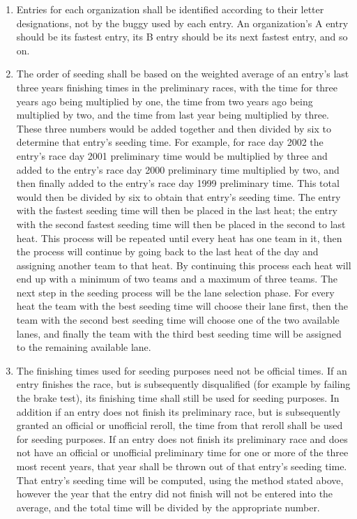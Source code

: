 	\begin{enumerate}

		\item Entries for each organization shall be identified according to their letter designations, not by the buggy used by each entry. An organization's A entry should be its fastest entry, its B entry should be its next fastest entry, and so on.

		\item The order of seeding shall be based on the weighted average of an entry's last three years finishing times in the preliminary races, with the time for three years ago being multiplied by one, the time from two years ago being multiplied by two, and the time from last year being multiplied by three. These three numbers would be added together and then divided by six to determine that entry's seeding time. For example, for race day 2002 the entry's race day 2001 preliminary time would be multiplied by three and added to the entry's race day 2000 preliminary time multiplied by two, and then finally added to the entry's race day 1999 preliminary time. This total would then be divided by six to obtain that entry's seeding time. The entry with the fastest seeding time will then be placed in the last heat; the entry with the second fastest seeding time will then be placed in the second to last heat. This process will be repeated until every heat has one team in it, then the process will continue by going back to the last heat of the day and assigning another team to that heat. By continuing this process each heat will end up with a minimum of two teams and a maximum of three teams. The next step in the seeding process will be the lane selection phase. For every heat the team with the best seeding time will choose their lane first, then the team with the second best seeding time will choose one of the two available lanes, and finally the team with the third best seeding time will be assigned to the remaining available lane.

		\item The finishing times used for seeding purposes need not be official times. If an entry finishes the race, but is subsequently disqualified (for example by failing the brake test), its finishing time shall still be used for seeding purposes. In addition if an entry does not finish its preliminary race, but is subsequently granted an official or unofficial reroll, the time from that reroll shall be used for seeding purposes. If an entry does not finish its preliminary race and does not have an official or unofficial preliminary time for one or more of the three most recent years, that year shall be thrown out of that entry's seeding time. That entry's seeding time will be computed, using the method stated above, however the year that the entry did not finish will not be entered into the average, and the total time will be divided by the appropriate number.


\end{enumerate}
